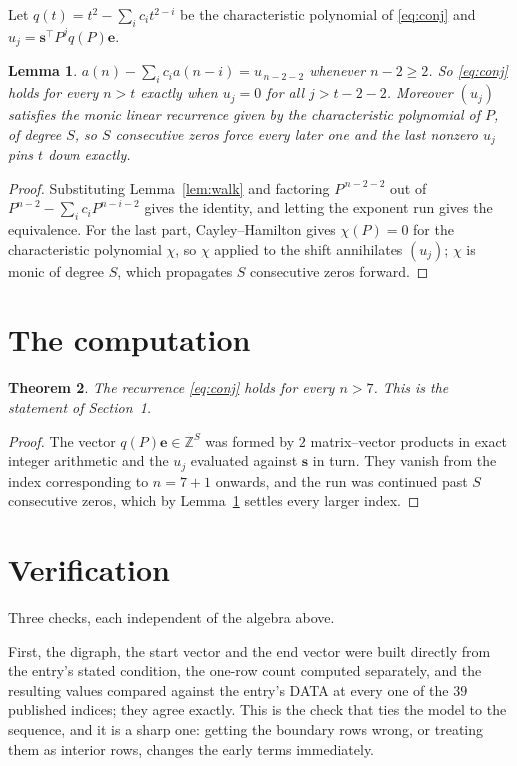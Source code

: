 \documentclass[11pt,a4paper]{article}
\theoremstyle{plain}
\newtheorem{theorem}{Theorem}
\newtheorem{lemma}[theorem]{Lemma}
\theoremstyle{definition}
\begin{document}
Let $q(t)=t^{2}-\sum_i c_i t^{2-i}$ be the characteristic polynomial of
\eqref{eq:conj} and $u_j=\mathbf{s}^{\!\top}P^{j}q(P)\mathbf{e}$.

\begin{lemma}\label{lem:crit}
$a(n)-\sum_i c_i a(n-i)=u_{\,n-2-2}$ whenever $n-2\ge2$. So \eqref{eq:conj}
holds for every $n>t$ exactly when $u_j=0$ for all $j>t-2-2$. Moreover $(u_j)$
satisfies the monic linear recurrence given by the characteristic polynomial of $P$, of
degree $S$, so $S$ consecutive zeros force every later one and the last nonzero $u_j$ pins
$t$ down exactly.
\end{lemma}

\begin{proof}
Substituting Lemma~\ref{lem:walk} and factoring $P^{\,n-2-2}$ out of
$P^{n-2}-\sum_i c_i P^{n-i-2}$ gives the identity, and letting the exponent run gives the
equivalence. For the last part, Cayley--Hamilton gives $\chi(P)=0$ for the characteristic
polynomial $\chi$, so $\chi$ applied to the shift annihilates $(u_j)$; $\chi$ is monic of
degree $S$, which propagates $S$ consecutive zeros forward.
\end{proof}

\section{The computation}

\begin{theorem}
The recurrence \eqref{eq:conj} holds for every $n>7$. This is the statement of
Section~1.
\end{theorem}

\begin{proof}
The vector $q(P)\mathbf{e}\in\mathbb{Z}^{S}$ was formed by $2$ matrix--vector
products in exact integer arithmetic and the $u_j$ evaluated against $\mathbf{s}$ in turn.
They vanish from the index corresponding to $n=7+1$ onwards, and the run was continued
past $S$ consecutive zeros, which by Lemma~\ref{lem:crit} settles every larger index.
\end{proof}

\section{Verification}

Three checks, each independent of the algebra above.

First, the digraph, the start vector and the end vector were built directly from the
entry's stated condition, the one-row count computed separately, and the resulting values
compared against the entry's DATA at every one of the $39$ published indices; they
agree exactly. This is the check that ties the model to the sequence, and it is a sharp one:
getting the boundary rows wrong, or treating them as interior rows, changes the early terms
immediately.
\end{document}
